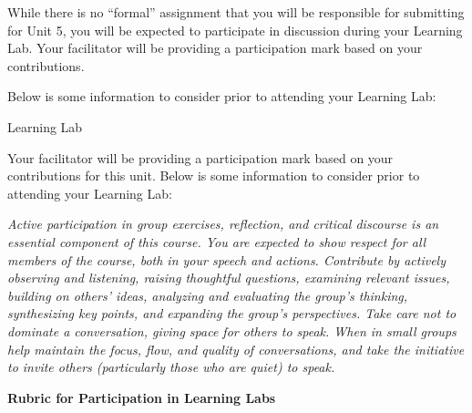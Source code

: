 \documentclass[
]{book}
\begin{document}
\begin{assessment}
While there is no ``formal'' assignment that you will be responsible for submitting for Unit 5, you will be expected to participate in discussion during your Learning Lab. Your facilitator will be providing a participation mark based on your contributions.

Below is some information to consider prior to attending your Learning Lab:

{Learning Lab}

Your facilitator will be providing a participation mark based on your contributions for this unit. Below is some information to consider prior to attending your Learning Lab:

\emph{Active participation in group exercises, reflection, and critical discourse is an essential component of this course. You are expected to show respect for all members of the course, both in your speech and actions. Contribute by actively observing and listening, raising thoughtful questions, examining relevant issues, building on others' ideas, analyzing and evaluating the group's thinking, synthesizing key points, and expanding the group's perspectives. Take care not to dominate a conversation, giving space for others to speak. When in small groups help maintain the focus, flow, and quality of conversations, and take the initiative to invite others (particularly those who are quiet) to speak.}

\textbf{Rubric for Participation in Learning Labs}


\end{assessment}
\end{document}
